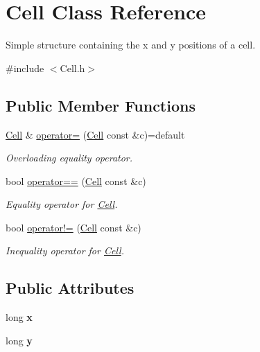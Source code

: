 \hypertarget{struct_cell}{}\section{Cell Class Reference}
\label{struct_cell}


Simple structure containing the x and y positions of a cell.  




{\ttfamily \#include $<$Cell.\+h$>$}

\subsection*{Public Member Functions}
\begin{DoxyCompactItemize}
\item 
\hyperlink{struct_cell}{Cell} \& \hyperlink{struct_cell_ac1f905d4cd626cc32963ab7a6f76634e}{operator=} (\hyperlink{struct_cell}{Cell} const \&c)=default
\begin{DoxyCompactList}\small\item\em Overloading equality operator. \end{DoxyCompactList}\item 
bool \hyperlink{struct_cell_abd251051519de0c0b3f2cdace1a2c684}{operator==} (\hyperlink{struct_cell}{Cell} const \&c)
\begin{DoxyCompactList}\small\item\em Equality operator for \hyperlink{struct_cell}{Cell}. \end{DoxyCompactList}\item 
bool \hyperlink{struct_cell_ac3b83bb33eb11dd036a4acecc7fa62d0}{operator!=} (\hyperlink{struct_cell}{Cell} const \&c)
\begin{DoxyCompactList}\small\item\em Inequality operator for \hyperlink{struct_cell}{Cell}. \end{DoxyCompactList}\end{DoxyCompactItemize}
\subsection*{Public Attributes}
\begin{DoxyCompactItemize}
\item 
long {\bfseries x}\hypertarget{struct_cell_a20ccaf4c7a18ce06930f961ed4fe3851}{}\label{struct_cell_a20ccaf4c7a18ce06930f961ed4fe3851}

\item 
long {\bfseries y}\hypertarget{struct_cell_a05aaf17f035c254584190b8ada505efc}{}\label{struct_cell_a05aaf17f035c254584190b8ada505efc}

\end{DoxyCompactItemize}


